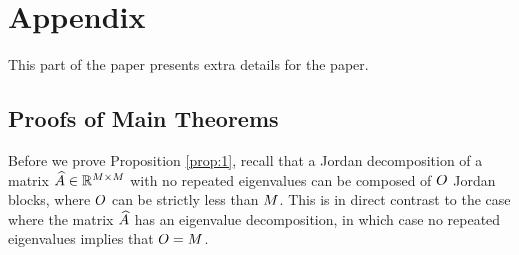 \section{Appendix}
This part of the paper presents extra details for the paper. 
\subsection{Proofs of Main Theorems}

Before we prove Proposition \ref{prop:1}, recall that a Jordan decomposition of a matrix $\widehat{A}\in\mathbb{R}^{M\times M}$ with no repeated eigenvalues can be composed of $O$ Jordan blocks, where $O$ can be strictly less than $M$. This is in direct contrast to the case where the matrix $\widehat{A}$ has an eigenvalue decomposition, in which case no repeated eigenvalues implies that $O = M$.  

